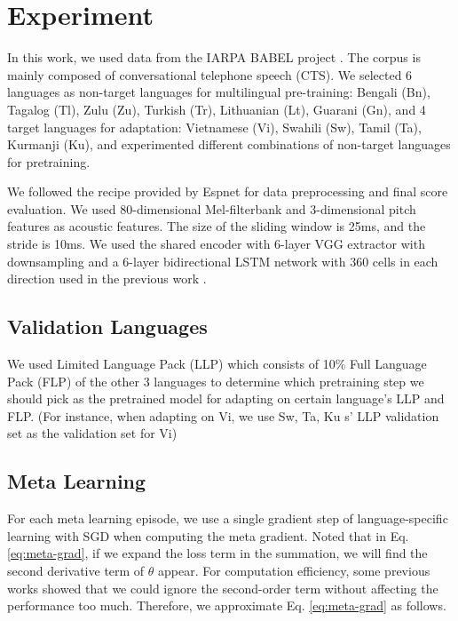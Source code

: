 \section{Experiment}
\label{sec:exp}

\label{ssec:exp-setup}
In this work, we used data from the IARPA BABEL project \cite{gales2014speech}. The corpus is mainly composed of conversational telephone speech (CTS). We selected 6 languages as non-target languages for multilingual pre-training: Bengali (Bn), Tagalog (Tl), Zulu (Zu), Turkish (Tr), Lithuanian (Lt), Guarani (Gn), and 4 target languages for adaptation: Vietnamese (Vi), Swahili (Sw), Tamil (Ta), Kurmanji (Ku), and experimented different combinations of non-target languages for pretraining.

We followed the recipe provided by Espnet \cite{watanabe2018espnet} for data preprocessing and final score evaluation.  We used 80-dimensional Mel-filterbank and 3-dimensional pitch features as acoustic features. The size of the sliding window is 25ms, and the stride is 10ms. We used the shared encoder with 6-layer VGG extractor with downsampling and a 6-layer bidirectional LSTM network with 360 cells in each direction used in the previous work \cite{dalmia2018sequence}.




\subsection{Validation Languages}
We used Limited Language Pack (LLP) which consists of 10\% Full Language Pack (FLP) of the other 3 languages to determine which pretraining step we should pick as the pretrained model for adapting on certain language's LLP and FLP. (For instance, when adapting on Vi, we use Sw, Ta, Ku s' LLP validation set as the validation set for Vi)

\subsection{Meta Learning}
For each meta learning episode, we use a single gradient step of language-specific learning with SGD when computing the meta gradient. Noted that in Eq. \ref{eq:meta-grad}, if we expand the loss term in the summation, we will find the second derivative term of $\theta$ appear. For computation efficiency, some previous works \cite{finn2017model, nichol2018reptile} showed that we could ignore the second-order term without affecting the performance too much. Therefore, we approximate Eq. \ref{eq:meta-grad} as follows.

